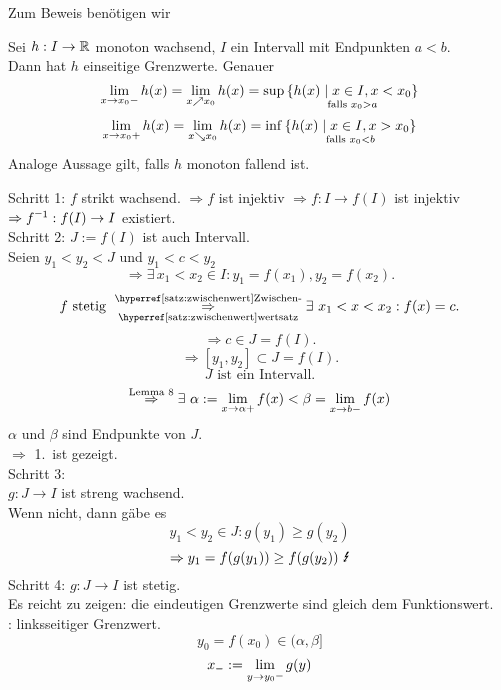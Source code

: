 \documentclass[../ana1.tex]{subfiles}
\begin{document}
\begin{prosa}
    Zum Beweis benötigen wir 
\end{prosa}
\begin{lem}\label{satz:monoton_grenzwert}
    Sei \( h: I \rightarrow \mathbb{R} \) monoton wachsend, \(I\) ein Intervall mit 
    Endpunkten \( a < b \).\\
    Dann hat \(h\) einseitige Grenzwerte. Genauer
    \[ \lim\limits_{x\rightarrow x_0 -} h(x) = \lim\limits_{x \nearrow x_0} h(x) 
    = \sup \underset{\text{falls } x_0 > a}{\{ h(x) 
    \; \vert \; x \in I, x < x_0 \}} \]
    \[ \lim\limits_{x\rightarrow x_0 +} h(x) = \lim\limits_{x \searrow x_0} h(x) 
    = \inf \underset{\text{falls } x_0 < b}{\{ h(x) 
    \; \vert \; x \in I, x > x_0 \}} \]
    Analoge Aussage gilt, falls \(h\) monoton fallend ist.
\end{lem}
\begin{bew}
    Schritt 1: \(f\) strikt wachsend. 
    \( \Rightarrow f \) ist injektiv \( \Rightarrow f : 
    I \rightarrow f(I) \) ist injektiv \( \Rightarrow \inverse{f} : 
    f(I) \rightarrow I \) existiert.\\
    Schritt 2: \( J := f(I) \) ist auch Intervall.\\
    Seien \( y_1 < y_2 < J \) und \( y_1 < c < y_2 \)
    \[ \Rightarrow \exists \, x_1 < x_2 \in I : y_1 = f(x_1), 
    y_2 = f(x_2). \]
    \[ f \text{ stetig } 
    \overunderref{satz:zwischenwert}{Zwischen-}{wertsatz}{\Rightarrow}
    \exists \, x_1 < x < x_2: f(x) = c. \]
    \[ \Rightarrow c \in J = f(I). \]
    \[ \Rightarrow [y_1, y_2] \subset J = f(I). \]
    \[ J \text{ ist ein Intervall.} \]
    \[ \oversett{Lemma 8}{\Rightarrow} \exists \, \alpha := 
    \limesx{x}{\alpha +} f(x) < \beta = \limesx{x}{b -} f(x) \]
    \( \alpha \) und \( \beta \) sind Endpunkte von \(J\).\\ 
    \( \Rightarrow \) 1.\ ist gezeigt.\\
    Schritt 3: \\
    \( g: J \rightarrow I \) ist streng wachsend.\\
    Wenn nicht, dann gäbe es 
    \[ y_1 < y_2 \in J : g(y_1) \geq g(y_2) \]
    \[ \Rightarrow y_1 = f(g(y_1)) \geq f(g(y_2)) \text{ \Lightning{}} \]
    Schritt 4: \( g: J \rightarrow I \) ist stetig.\\
    Es reicht zu zeigen: die eindeutigen Grenzwerte sind gleich dem 
    Funktionswert.\\
    \Obda: linksseitiger Grenzwert.
    \[ y_0 = f(x_0) \in (\alpha, \beta] \]
    \[ x_{\minus} := \limesx{y}{y_0 \minus} g(y) 
\]
\end{bew}
\end{document}
